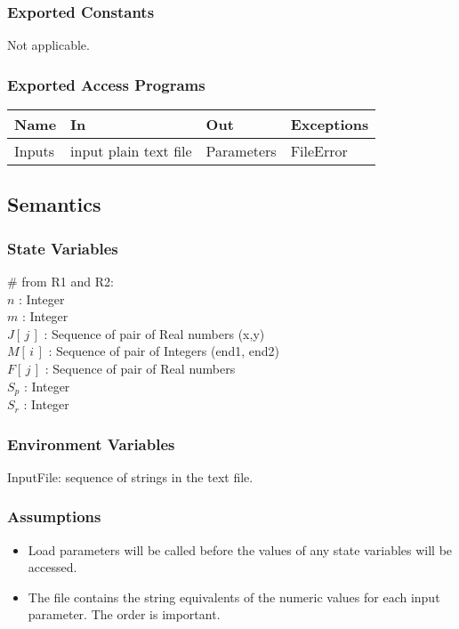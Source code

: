 \documentclass[12pt, titlepage]{article}
\begin{document}
\subsubsection{Exported Constants}
Not applicable.

\subsubsection{Exported Access Programs}

\begin{center}
\begin{tabular}{p{2cm} p{4cm} p{4cm} p{2cm}}
\hline
\textbf{Name} & \textbf{In} & \textbf{Out} & \textbf{Exceptions} \\
\hline
Inputs & input plain text file & Parameters & FileError \\
\hline
\end{tabular}
\end{center}

\subsection{Semantics}
\subsubsection{State Variables}
$\#$ from R1 and R2:\\
$n$ : Integer \\
$m$ : Integer \\
$J[\,j\,]$ : Sequence of pair of Real numbers (x,y) \\
$M[\,i\,]$ : Sequence of pair of Integers (end1, end2)\\
$F[\,j\,]$ : Sequence of pair of Real numbers  \\
$S_p$ : Integer \\
$S_r$ : Integer \\




\subsubsection{Environment Variables}

InputFile: sequence of strings in the text file.

\subsubsection{Assumptions}
\begin{itemize}
    \item {Load parameters will be called before the values of any state variables will be accessed.}
    \item{The file contains the string equivalents of the numeric values for each input parameter. The order is important.}
\end{itemize}
\end{document}
